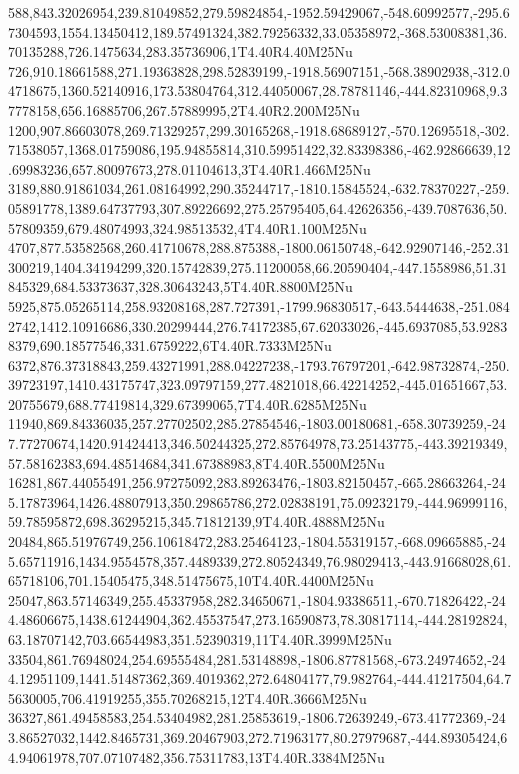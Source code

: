 588,843.32026954,239.81049852,279.59824854,-1952.59429067,-548.60992577,-295.67304593,1554.13450412,189.57491324,382.79256332,33.05358972,-368.53008381,36.70135288,726.1475634,283.35736906,1T4.40R4.40M25Nu
726,910.18661588,271.19363828,298.52839199,-1918.56907151,-568.38902938,-312.04718675,1360.52140916,173.53804764,312.44050067,28.78781146,-444.82310968,9.37778158,656.16885706,267.57889995,2T4.40R2.200M25Nu
1200,907.86603078,269.71329257,299.30165268,-1918.68689127,-570.12695518,-302.71538057,1368.01759086,195.94855814,310.59951422,32.83398386,-462.92866639,12.69983236,657.80097673,278.01104613,3T4.40R1.466M25Nu
3189,880.91861034,261.08164992,290.35244717,-1810.15845524,-632.78370227,-259.05891778,1389.64737793,307.89226692,275.25795405,64.42626356,-439.7087636,50.57809359,679.48074993,324.98513532,4T4.40R1.100M25Nu
4707,877.53582568,260.41710678,288.875388,-1800.06150748,-642.92907146,-252.31300219,1404.34194299,320.15742839,275.11200058,66.20590404,-447.1558986,51.31845329,684.53373637,328.30643243,5T4.40R.8800M25Nu
5925,875.05265114,258.93208168,287.727391,-1799.96830517,-643.5444638,-251.0842742,1412.10916686,330.20299444,276.74172385,67.62033026,-445.6937085,53.92838379,690.18577546,331.6759222,6T4.40R.7333M25Nu
6372,876.37318843,259.43271991,288.04227238,-1793.76797201,-642.98732874,-250.39723197,1410.43175747,323.09797159,277.4821018,66.42214252,-445.01651667,53.20755679,688.77419814,329.67399065,7T4.40R.6285M25Nu
11940,869.84336035,257.27702502,285.27854546,-1803.00180681,-658.30739259,-247.77270674,1420.91424413,346.50244325,272.85764978,73.25143775,-443.39219349,57.58162383,694.48514684,341.67388983,8T4.40R.5500M25Nu
16281,867.44055491,256.97275092,283.89263476,-1803.82150457,-665.28663264,-245.17873964,1426.48807913,350.29865786,272.02838191,75.09232179,-444.96999116,59.78595872,698.36295215,345.71812139,9T4.40R.4888M25Nu
20484,865.51976749,256.10618472,283.25464123,-1804.55319157,-668.09665885,-245.65711916,1434.9554578,357.4489339,272.80524349,76.98029413,-443.91668028,61.65718106,701.15405475,348.51475675,10T4.40R.4400M25Nu
25047,863.57146349,255.45337958,282.34650671,-1804.93386511,-670.71826422,-244.48606675,1438.61244904,362.45537547,273.16590873,78.30817114,-444.28192824,63.18707142,703.66544983,351.52390319,11T4.40R.3999M25Nu
33504,861.76948024,254.69555484,281.53148898,-1806.87781568,-673.24974652,-244.12951109,1441.51487362,369.4019362,272.64804177,79.982764,-444.41217504,64.75630005,706.41919255,355.70268215,12T4.40R.3666M25Nu
36327,861.49458583,254.53404982,281.25853619,-1806.72639249,-673.41772369,-243.86527032,1442.8465731,369.20467903,272.71963177,80.27979687,-444.89305424,64.94061978,707.07107482,356.75311783,13T4.40R.3384M25Nu
